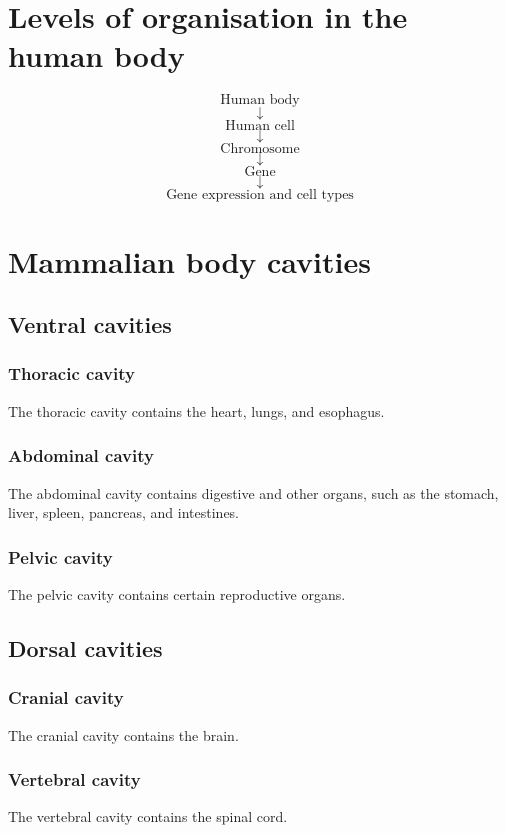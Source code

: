 \documentclass[11pt]{article}
\begin{document}
\newpage

\section{Levels of organisation in the human body}
\label{sec:org9b5e165}
\[\text{Human body}\]
\[\downarrow\]
\[\text{Human cell}\]
\[\downarrow\]
\[\text{Chromosome}\]
\[\downarrow\]
\[\text{Gene}\]
\[\downarrow\]
\[\text{Gene expression and cell types}\]

\section{Mammalian body cavities}
\label{sec:orgd3ab211}

\subsection{Ventral cavities}
\label{sec:orgf872f63}

\subsubsection{Thoracic cavity}
\label{sec:org74951ad}
The thoracic cavity contains the heart, lungs, and esophagus.

\subsubsection{Abdominal cavity}
\label{sec:orgf3a2eae}
The abdominal cavity contains digestive and other organs, such as the stomach, liver, spleen, pancreas, and intestines.

\subsubsection{Pelvic cavity}
\label{sec:org5ab62ba}
The pelvic cavity contains certain reproductive organs.

\subsection{Dorsal cavities}
\label{sec:orgb360b33}

\subsubsection{Cranial cavity}
\label{sec:org23c7166}
The cranial cavity contains the brain.

\subsubsection{Vertebral cavity}
\label{sec:org5d527bb}
The vertebral cavity contains the spinal cord.
\end{document}
